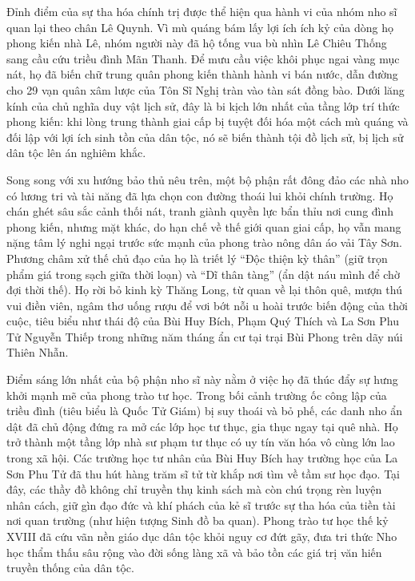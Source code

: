 Đỉnh điểm của sự tha hóa chính trị được thể hiện qua hành vi của nhóm nho sĩ quan lại theo chân Lê Quynh. Vì mù quáng bám lấy lợi ích ích kỷ của dòng họ phong kiến nhà Lê, nhóm người này đã hộ tống vua bù nhìn Lê Chiêu Thống sang cầu cứu triều đình Mãn Thanh. Để mưu cầu việc khôi phục ngai vàng mục nát, họ đã biến chữ trung quân phong kiến thành hành vi bán nước, dẫn đường cho 29 vạn quân xâm lược của Tôn Sĩ Nghị tràn vào tàn sát đồng bào. Dưới lăng kính của chủ nghĩa duy vật lịch sử, đây là bi kịch lớn nhất của tầng lớp trí thức phong kiến: khi lòng trung thành giai cấp bị tuyệt đối hóa một cách mù quáng và đối lập với lợi ích sinh tồn của dân tộc, nó sẽ biến thành tội đồ lịch sử, bị lịch sử dân tộc lên án nghiêm khắc.

Song song với xu hướng bảo thủ nêu trên, một bộ phận rất đông đảo các nhà nho có lương tri và tài năng đã lựa chọn con đường thoái lui khỏi chính trường. Họ chán ghét sâu sắc cảnh thối nát, tranh giành quyền lực bẩn thỉu nơi cung đình phong kiến, nhưng mặt khác, do hạn chế về thế giới quan giai cấp, họ vẫn mang nặng tâm lý nghi ngại trước sức mạnh của phong trào nông dân áo vải Tây Sơn. Phương châm xử thế chủ đạo của họ là triết lý ``Độc thiện kỳ thân'' (giữ trọn phẩm giá trong sạch giữa thời loạn) và ``Dĩ thân tàng'' (ẩn dật náu mình để chờ đợi thời thế). Họ rời bỏ kinh kỳ Thăng Long, từ quan về lại thôn quê, mượn thú vui điền viên, ngâm thơ uống rượu để vơi bớt nỗi u hoài trước biến động của thời cuộc, tiêu biểu như thái độ của Bùi Huy Bích, Phạm Quý Thích và La Sơn Phu Tử Nguyễn Thiếp trong những năm tháng ẩn cư tại trại Bùi Phong trên dãy núi Thiên Nhẫn.

Điểm sáng lớn nhất của bộ phận nho sĩ này nằm ở việc họ đã thúc đẩy sự hưng khởi mạnh mẽ của phong trào tư học. Trong bối cảnh trường ốc công lập của triều đình (tiêu biểu là Quốc Tử Giám) bị suy thoái và bỏ phế, các danh nho ẩn dật đã chủ động đứng ra mở các lớp học tư thục, gia thục ngay tại quê nhà. Họ trở thành một tầng lớp nhà sư phạm tư thục có uy tín văn hóa vô cùng lớn lao trong xã hội. Các trường học tư nhân của Bùi Huy Bích hay trường học của La Sơn Phu Tử đã thu hút hàng trăm sĩ tử từ khắp nơi tìm về tầm sư học đạo. Tại đây, các thầy đồ không chỉ truyền thụ kinh sách mà còn chú trọng rèn luyện nhân cách, giữ gìn đạo đức và khí phách của kẻ sĩ trước sự tha hóa của tiền tài nơi quan trường (như hiện tượng Sinh đồ ba quan). Phong trào tư học thế kỷ XVIII đã cứu vãn nền giáo dục dân tộc khỏi nguy cơ đứt gãy, đưa tri thức Nho học thẩm thấu sâu rộng vào đời sống làng xã và bảo tồn các giá trị văn hiến truyền thống của dân tộc.

